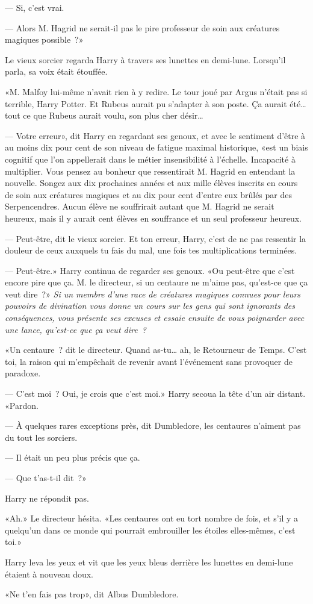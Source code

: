 --- Si, c'est vrai.

--- Alors M. Hagrid ne serait-il pas le pire professeur de soin aux créatures magiques possible~?»

Le vieux sorcier regarda Harry à travers ses lunettes en demi-lune. Lorsqu'il parla, sa voix était étouffée.

«M. Malfoy lui-même n'avait rien à y redire. Le tour joué par Argus n'était pas si terrible, Harry Potter. Et Rubeus aurait pu s'adapter à son poste. Ça aurait été… tout ce que Rubeus aurait voulu, son plus cher désir…

--- Votre erreur», dit Harry en regardant ses genoux, et avec le sentiment d'être à au moins dix pour cent de son niveau de fatigue maximal historique, «est un biais cognitif que l'on appellerait dans le métier insensibilité à l'échelle. Incapacité à multiplier. Vous pensez au bonheur que ressentirait M. Hagrid en entendant la nouvelle. Songez aux dix prochaines années et aux mille élèves inscrits en cours de soin aux créatures magiques et au dix pour cent d'entre eux brûlés par des Serpencendres. Aucun élève ne souffrirait autant que M. Hagrid ne serait heureux, mais il y aurait cent élèves en souffrance et un seul professeur heureux.

--- Peut-être, dit le vieux sorcier. Et ton erreur, Harry, c'est de ne pas ressentir la douleur de ceux auxquels tu fais du mal, une fois tes multiplications terminées.

--- Peut-être.» Harry continua de regarder ses genoux. «Ou peut-être que c'est encore pire que ça. M. le directeur, si un centaure ne m'aime pas, qu'est-ce que ça veut dire~?» \emph{Si un membre d'une race de créatures magiques connues pour leurs pouvoirs de divination vous donne un cours sur les gens qui sont ignorants des conséquences, vous présente ses excuses et essaie ensuite de vous poignarder avec une lance, qu'est-ce que ça veut dire~?}

«Un centaure~? dit le directeur. Quand as-tu… ah, le Retourneur de Temps. C'est toi, la raison qui m'empêchait de revenir avant l'événement sans provoquer de paradoxe.

--- C'est moi~? Oui, je crois que c'est moi.» Harry secoua la tête d'un air distant. «Pardon.

--- À quelques rares exceptions près, dit Dumbledore, les centaures n'aiment pas du tout les sorciers.

--- Il était un peu plus précis que ça.

--- Que t'as-t-il dit~?»

Harry ne répondit pas.

«Ah.» Le directeur hésita. «Les centaures ont eu tort nombre de fois, et s'il y a quelqu'un dans ce monde qui pourrait embrouiller les étoiles elles-mêmes, c'est toi.»

Harry leva les yeux et vit que les yeux bleus derrière les lunettes en demi-lune étaient à nouveau doux.

«Ne t'en fais pas trop», dit Albus Dumbledore.  
